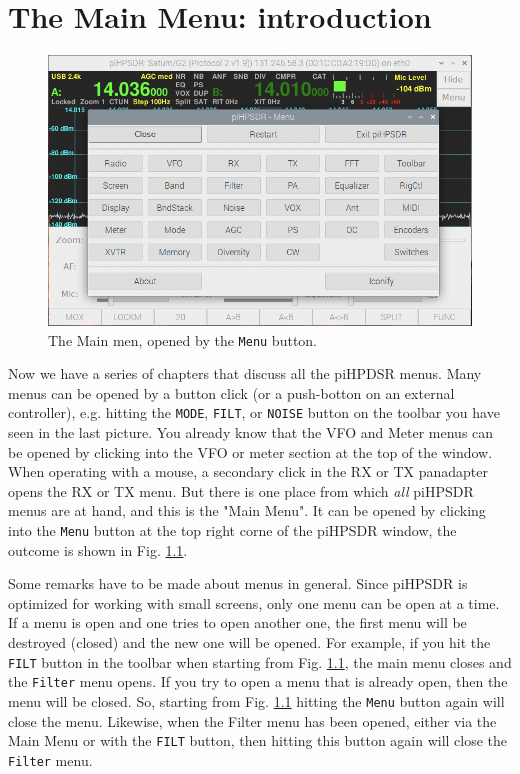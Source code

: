 \documentclass[12pt]{book}
\def\rett#1{\texttt{\color{red}#1}}
\def\bltt#1{\texttt{\color{blue}#1}}
\begin{document}
\chapter{The Main Menu: introduction}

\begin{figure}[h]
\center
\includegraphics[width=12cm]{MainMenu.png}
\caption{The Main men, opened by the \rett{Menu} button.}
\label{fig:MainMenu}
\end{figure}

Now we have a series of chapters that discuss all the piHPDSR menus. Many menus can be
opened by a button click (or a push-botton on an external controller), e.g. hitting the
 \rett{MODE}, \rett{FILT}, or \rett{NOISE} button on the
toolbar you have seen in the last picture. You already know that the VFO and Meter
menus can be opened by clicking into the VFO or meter section at the top of the window.
When operating with a mouse, a secondary click in the RX or TX panadapter opens the
RX or TX menu. But there is one place from which \textit{all} piHPSDR menus are at hand,
and this is the "Main Menu". It can be opened by clicking into the \rett{Menu} button at the
top right corne of the piHPSDR window, the outcome is shown in Fig. \ref{fig:MainMenu}.

Some remarks have to be made about menus in general. Since piHPSDR is optimized for
working with small screens, only one menu can be open at a time. If a menu is open
and one tries to open another one, the first menu will be destroyed (closed) and the
new one will be opened. For example, if you hit the \rett{FILT} button in the toolbar
when starting from Fig. \ref{fig:MainMenu}, the main menu closes and the \bltt{Filter} menu
opens. If you try to open a menu that is already open, then the menu will be closed.
So, starting from Fig. \ref{fig:MainMenu} hitting the \rett{Menu} button again will close
the menu. Likewise, when the Filter menu has been opened, either via the Main Menu
or with the \rett{FILT} button, then hitting this button again will close the 
\bltt{Filter} menu.
\end{document}
